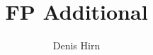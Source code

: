 
\author{Denis Hirn}
\title{FP Additional}

\usepackage{fancyhdr}
\pagestyle{fancy}

\renewcommand{\headrulewidth}{1pt}
\renewcommand{\footrulewidth}{0.4pt}

\renewcommand{\i}{\mathtt{i}}
\renewcommand{\b}{\mathtt{b}}
\newcommand{\integer}{\ensuremath{\mathtt{integer}}}

\addtolength{\textwidth}{80px}
\addtolength{\hoffset}{-40px}
\addtolength{\topmargin}{-30px}
\addtolength{\textheight}{30px}

\setlength{\headheight}{41.6px}

\fancyheadoffset{20pt}

\newcommand{\bbl}{\textlbrackdbl{}}
\newcommand{\bbr}{\textrbrackdbl{}}
\newcommand{\Pot}{\ensuremath{\mathcal{P}}}

\newcommand{\qq}[1]{\glqq #1 \grqq}
\newcommand{\N}{\ensuremath{\mathbb{N}}}
\newcommand{\Z}{\ensuremath{\mathbb{Z}}}
\newcommand{\R}{\ensuremath{\mathbb{R}}}
\newcommand{\Q}{\ensuremath{\mathbb{Q}}}
\newcommand{\0}{\ensuremath{\mathcal{O}}}

\newcommand{\abs}[1]{\ensuremath{ | #1 |}}
\newcommand{\dol}{\ensuremath{\$ {}}}
\newenvironment{abc}{\begin{list}{\alph{iabc})}{\usecounter{iabc}}}{\end{list}}
